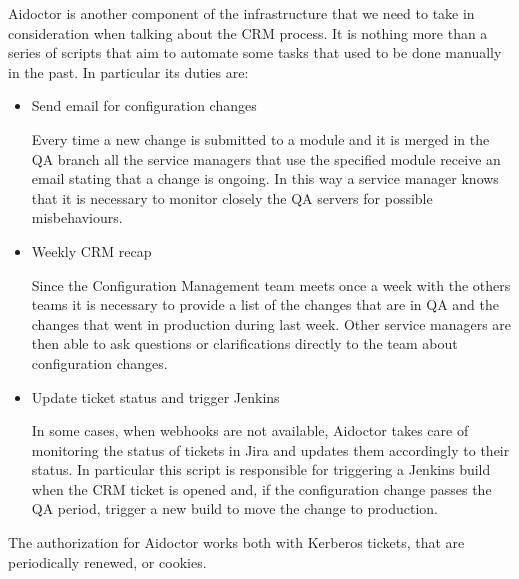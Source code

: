 Aidoctor is another component of the infrastructure that we need to take in
consideration when talking about the CRM process. It is nothing more than
a series of scripts that aim to automate some tasks that used to be done
manually in the past. In particular its duties are:

\begin{itemize}

  \item Send email for configuration changes

  Every time a new change is submitted to a module and it is merged in the QA
  branch all the service managers that use the specified module receive an
  email stating that a change is ongoing. In this way a service manager knows
  that it is necessary to monitor closely the QA servers for possible
  misbehaviours.

  \item Weekly CRM recap

  Since the Configuration Management team meets once a week with the others
  teams it is necessary to provide a list of the changes that are in QA
  and the changes that went in production during last week. Other service
  managers are then able to ask questions or clarifications directly to
  the team about configuration changes.

  \item Update ticket status and trigger Jenkins

  In some cases, when webhooks are not available, Aidoctor takes care of
  monitoring the status of tickets in Jira and updates them accordingly to
  their status. In particular this script is responsible for triggering
  a Jenkins build when the CRM ticket is opened and, if the configuration
  change passes the QA period, trigger a new build to move the change to
  production.

\end{itemize}

The authorization for Aidoctor works both with Kerberos tickets, that are
periodically renewed, or cookies.
